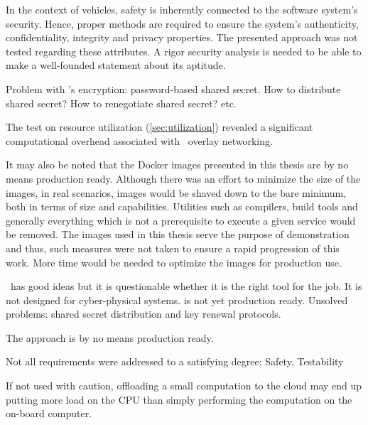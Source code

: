 In the context of vehicles, safety is inherently connected to the software system's security. Hence, proper methods are required to ensure the system's authenticity, confidentiality, integrity and privacy properties. The presented approach was not tested regarding these attributes. A rigor security analysis is needed to be able to make a well-founded statement about its aptitude.

Problem with \wnet 's encryption: password-based shared secret. How to distribute shared secret? How to renegotiate shared secret? etc.

The test on resource utilization (\cf \autoref{sec:utilization}) revealed a significant computational overhead associated with \wnet\ overlay networking. 

It may also be noted that the Docker images presented in this thesis are by no means production ready. Although there was an effort to minimize the size of the images, in real scenarios, images would be shaved down to the bare minimum, both in terms of size and capabilities. Utilities such as compilers, build tools and generally everything which is not a prerequisite to execute a given service would be removed. The images used in this thesis serve the purpose of demonstration and thus, such measures were not taken to ensure a rapid progression of this work. More time would be needed to optimize the images for production use.



\weave\ has good ideas but it is questionable whether it is the right tool for the job. It is not designed for cyber-physical systems. is not yet production ready. Unsolved problems: shared secret distribution and key renewal protocols.


The approach is by no means production ready.


Not all requirements were addressed to a satisfying degree: Safety, Testability

If not used with caution, offloading a small computation to the cloud may end up putting more load on the CPU than simply performing the computation on the on-board computer.

